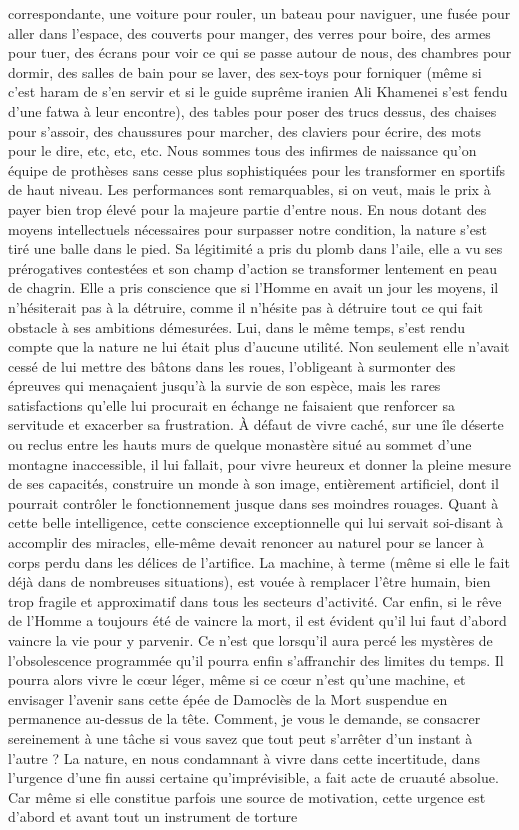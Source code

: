 correspondante, une voiture pour rouler, un bateau pour naviguer, une fusée pour aller dans l’espace, des couverts pour manger, des verres pour boire, des armes pour tuer, des écrans pour voir ce qui se passe autour de nous, des chambres pour dormir, des salles de bain pour se laver, des sex-toys pour forniquer (même si c’est haram de s’en servir et si le guide suprême iranien Ali Khamenei s’est fendu d’une fatwa à leur encontre), des tables pour poser des trucs dessus, des chaises pour s’assoir, des chaussures pour marcher, des claviers pour écrire, des mots pour le dire, etc, etc, etc. Nous sommes tous des infirmes de naissance qu’on équipe de prothèses sans cesse plus sophistiquées pour les transformer en sportifs de haut niveau. Les performances sont remarquables, si on veut, mais le prix à payer bien trop élevé pour la majeure partie d’entre nous. En nous dotant des moyens intellectuels nécessaires pour surpasser notre condition, la nature s’est tiré une balle dans le pied. Sa légitimité a pris du plomb dans l’aile, elle a vu ses prérogatives contestées et son champ d’action se transformer lentement en peau de chagrin. Elle a pris conscience que si l’Homme en avait un jour les moyens, il n’hésiterait pas à la détruire, comme il n’hésite pas à détruire tout ce qui fait obstacle à ses ambitions démesurées. Lui, dans le même temps, s’est rendu compte que la nature ne lui était plus d’aucune utilité. Non seulement elle n’avait cessé de lui mettre des bâtons dans les roues, l’obligeant à surmonter des épreuves qui menaçaient jusqu’à la survie de son espèce, mais les rares satisfactions qu’elle lui procurait en échange ne faisaient que renforcer sa servitude et exacerber sa frustration. À défaut de vivre caché, sur une île déserte ou reclus entre les hauts murs de quelque monastère situé au sommet d’une montagne inaccessible, il lui fallait, pour vivre heureux et donner la pleine mesure de ses capacités, construire un monde à son image, entièrement artificiel, dont il pourrait contrôler le fonctionnement jusque dans ses moindres rouages. Quant à cette belle intelligence, cette conscience exceptionnelle qui lui servait soi-disant à accomplir des miracles, elle-même devait renoncer au naturel pour se lancer à corps perdu dans les délices de l’artifice. La machine, à terme (même si elle le fait déjà dans de nombreuses situations), est vouée à remplacer l’être humain, bien trop fragile et approximatif dans tous les secteurs d’activité. Car enfin, si le rêve de l’Homme a toujours été de vaincre la mort, il est évident qu’il lui faut d’abord vaincre la vie pour y parvenir. Ce n’est que lorsqu’il aura percé les mystères de l’obsolescence programmée qu’il pourra enfin s’affranchir des limites du temps. Il pourra alors vivre le cœur léger, même si ce cœur n’est qu’une machine, et envisager l’avenir sans cette épée de Damoclès de la Mort suspendue en permanence au-dessus de la tête. Comment, je vous le demande, se consacrer sereinement à une tâche si vous savez que tout peut s’arrêter d’un instant à l’autre ? La nature, en nous condamnant à vivre dans cette incertitude, dans l’urgence d’une fin aussi certaine qu’imprévisible, a fait acte de cruauté absolue. Car même si elle constitue parfois une source de motivation, cette urgence est d’abord et avant tout un instrument de torture 